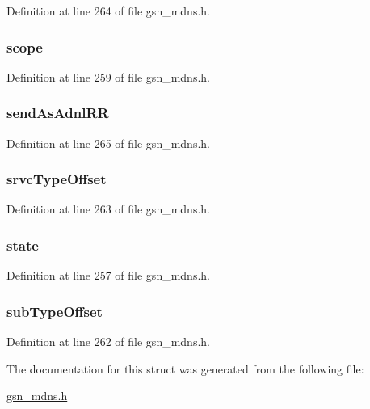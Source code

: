 Definition at line 264 of file gsn\_\-mdns.h.

\hypertarget{a00457_aa73cc4a6cdd8178cc27ecbdd515c750c}{
\subsubsection[{scope}]{ {\bf scope}}}
\label{a00457_aa73cc4a6cdd8178cc27ecbdd515c750c}


Definition at line 259 of file gsn\_\-mdns.h.

\hypertarget{a00457_a2059497fe249a99ce47098b51abd9e04}{
\subsubsection[{sendAsAdnlRR}]{ {\bf sendAsAdnlRR}}}
\label{a00457_a2059497fe249a99ce47098b51abd9e04}


Definition at line 265 of file gsn\_\-mdns.h.

\hypertarget{a00457_a3f962f77c0abfaa0e61a70b72f6df844}{
\subsubsection[{srvcTypeOffset}]{ {\bf srvcTypeOffset}}}
\label{a00457_a3f962f77c0abfaa0e61a70b72f6df844}


Definition at line 263 of file gsn\_\-mdns.h.

\hypertarget{a00457_a6e9c4cbd32a1178b12f3a61f6855c896}{
\subsubsection[{state}]{ {\bf state}}}
\label{a00457_a6e9c4cbd32a1178b12f3a61f6855c896}


Definition at line 257 of file gsn\_\-mdns.h.

\hypertarget{a00457_aca5f18fef926c93c584fd96703207162}{
\subsubsection[{subTypeOffset}]{ {\bf subTypeOffset}}}
\label{a00457_aca5f18fef926c93c584fd96703207162}


Definition at line 262 of file gsn\_\-mdns.h.



The documentation for this struct was generated from the following file:\begin{DoxyCompactItemize}
\item 
\hyperlink{a00526}{gsn\_\-mdns.h}\end{DoxyCompactItemize}
